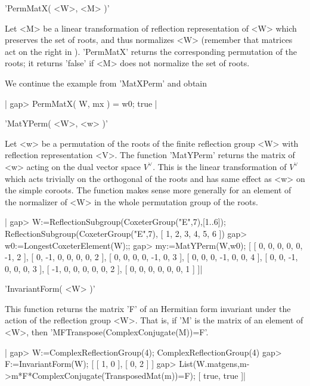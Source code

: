 
'PermMatX( <W>, <M> )'

Let <M> be  a linear transformation of reflection  representation of <W>
which  preserves the  set of  roots, and  thus normalizes  <W> (remember
that  matrices  act on  the  right in  {\GAP}). 'PermMatX'  returns  the
corresponding permutation of  the roots; it returns 'false'  if <M> does
not normalize the set of roots.

We continue the example from 'MatXPerm' and obtain\:

|    gap> PermMatX( W, mx ) = w0;
    true |


'MatYPerm( <W>, <w> )'

Let  <w> be a permutation  of the roots of  the finite reflection group <W>
with  reflection representation  <V>. The  function 'MatYPerm'  returns the
matrix  of <w> acting on the dual vector space $V^\vee$. This is the linear
transformation  of $V^\vee$ which  acts trivially on  the orthogonal of the
roots  and has same effect as <w> on the simple coroots. The function makes
sense  more generally for an element of  the normalizer of <W> in the whole
permutation group of the roots.

|    gap>  W:=ReflectionSubgroup(CoxeterGroup("E",7),[1..6]);
    ReflectionSubgroup(CoxeterGroup("E",7), [ 1, 2, 3, 4, 5, 6 ])
    gap>  w0:=LongestCoxeterElement(W);;
    gap> my:=MatYPerm(W,w0);
    [ [ 0, 0, 0, 0, 0, -1, 2 ], [ 0, -1, 0, 0, 0, 0, 2 ],
      [ 0, 0, 0, 0, -1, 0, 3 ], [ 0, 0, 0, -1, 0, 0, 4 ],
      [ 0, 0, -1, 0, 0, 0, 3 ], [ -1, 0, 0, 0, 0, 0, 2 ],
      [ 0, 0, 0, 0, 0, 0, 1 ] ]|


'InvariantForm( <W> )'

This  function returns the matrix 'F'  of an Hermitian form invariant under
the action of the reflection group <W>. That is, if 'M' is the matrix of an
element of <W>, then 'M\*F\*Transpose(ComplexConjugate(M))=F'.

|    gap> W:=ComplexReflectionGroup(4);
    ComplexReflectionGroup(4)
    gap> F:=InvariantForm(W);
    [ [ 1, 0 ], [ 0, 2 ] ]
    gap> List(W.matgens,m->m*F*ComplexConjugate(TransposedMat(m))=F);
    [ true, true ]|

